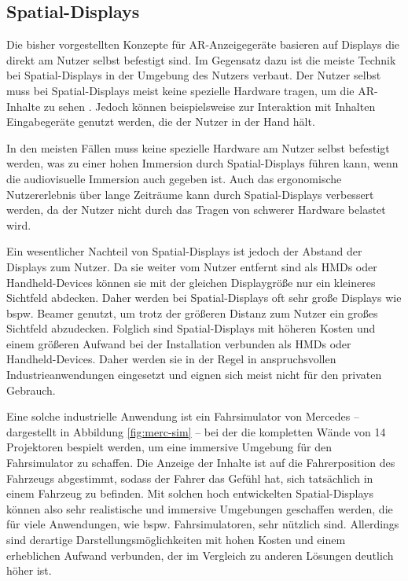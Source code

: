  \newpage

  \subsection{Spatial-Displays}

  Die bisher vorgestellten Konzepte für AR-Anzeigegeräte basieren auf Displays die direkt am Nutzer selbst befestigt sind.
  Im Gegensatz dazu ist die meiste Technik bei Spatial-Displays in der Umgebung des Nutzers verbaut.
  Der Nutzer selbst muss bei Spatial-Displays meist keine spezielle Hardware tragen, um die AR-Inhalte zu sehen \autocite[]{bimber2006modern}.
  Jedoch können beispielsweise zur Interaktion mit Inhalten Eingabegeräte genutzt werden, die der Nutzer in der Hand hält.

  In den meisten Fällen muss keine spezielle Hardware am Nutzer selbst befestigt werden, was zu einer hohen Immersion durch Spatial-Displays führen kann, wenn die audiovisuelle Immersion auch gegeben ist.
  Auch das ergonomische Nutzererlebnis über lange Zeiträume kann durch Spatial-Displays verbessert werden, da der Nutzer nicht durch das Tragen von schwerer Hardware belastet wird.

  Ein wesentlicher Nachteil von Spatial-Displays ist jedoch der Abstand der Displays zum Nutzer.
  Da sie weiter vom Nutzer entfernt sind als HMDs oder Handheld-Devices können sie mit der gleichen Displaygröße nur ein kleineres Sichtfeld abdecken.
  Daher werden bei Spatial-Displays oft sehr große Displays wie bspw. Beamer genutzt, um trotz der größeren Distanz zum Nutzer ein großes Sichtfeld abzudecken.
  Folglich sind Spatial-Displays mit höheren Kosten und einem größeren Aufwand bei der Installation verbunden als HMDs oder Handheld-Devices.
  Daher werden sie in der Regel in anspruchsvollen Industrieanwendungen eingesetzt und eignen sich meist nicht für den privaten Gebrauch.

  \newpage

  Eine solche industrielle Anwendung ist ein Fahrsimulator von Mercedes -- dargestellt in Abbildung \ref{fig:merc-sim} -- bei der die kompletten Wände von 14 Projektoren bespielt werden, um eine immersive Umgebung für den Fahrsimulator zu schaffen.
  Die Anzeige der Inhalte ist auf die Fahrerposition des Fahrzeugs abgestimmt, sodass der Fahrer das Gefühl hat, sich tatsächlich in einem Fahrzeug zu befinden.
  Mit solchen hoch entwickelten Spatial-Displays können also sehr realistische und immersive Umgebungen geschaffen werden, die für viele Anwendungen, wie bspw. Fahrsimulatoren, sehr nützlich sind.
  Allerdings sind derartige Darstellungsmöglichkeiten mit hohen Kosten und einem erheblichen Aufwand verbunden, der im Vergleich zu anderen Lösungen deutlich höher ist.

